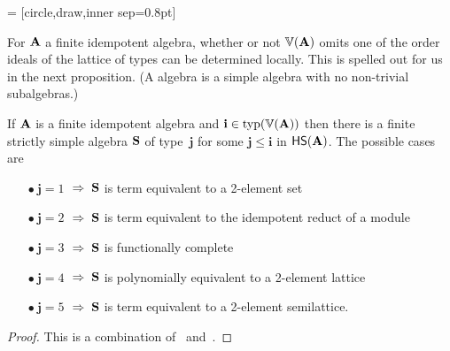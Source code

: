 \newcommand{\dotsize}{0.8pt}
 = [circle,draw,inner sep=\dotsize]
\begin{center}
\newcommand{\figscale}{.7}
\end{center}
For $\mathbf{A}$ a finite idempotent algebra, whether or not $\operatorname{\mathbb{V}}(\mathbf{A})$ omits one of the order ideals of the lattice of types can be
determined locally.  This is spelled out for us in the next proposition.
(A  algebra is a simple
algebra with no non-trivial subalgebras.)


\begin{prop}
  \label{prop:2.1}
If $\mathbf{A}$ is a finite idempotent algebra and
$\mathbf{i} \in \operatorname{typ}(\operatorname{\mathbb{V}}(\mathbf{A}))$ then there
is a finite strictly simple algebra $\mathbf{S}$ of
type~$\mathbf{j}$ for
some $\mathbf{j} \leq \mathbf{i}$ in $\mathsf{H} \mathsf{S} (\mathbf{A})$.
The possible cases are
\begin{itemize}
\item[$\bullet\  \mathbf{j} = 1$] $\;\Rightarrow \;\mathbf{S}$ is term equivalent to a 2-element set
\item[$\bullet\   \mathbf{j} = 2$] $\;\Rightarrow \;\mathbf{S}$ is term equivalent to the idempotent reduct of a module
\item[$\bullet\   \mathbf{j} = 3$] $\;\Rightarrow \;\mathbf{S}$ is functionally complete
\item[$\bullet\   \mathbf{j} = 4$] $\;\Rightarrow \;\mathbf{S}$ is polynomially equivalent to a 2-element lattice
\item[$\bullet\   \mathbf{j} = 5$] $\;\Rightarrow \;\mathbf{S}$ is term equivalent to a 2-element semilattice.
\end{itemize} %
\end{prop}
\begin{proof}
  This is a combination of~\cite[Proposition~3.1]{MR2504025} and~\cite[Theorem~6.1]{MR1191235}.
\end{proof}

